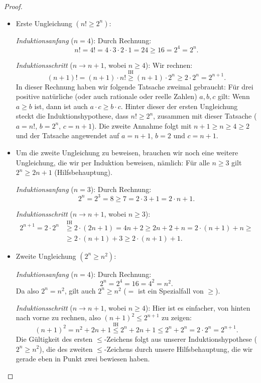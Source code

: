 \documentclass[a4paper,ngerman,12pt]{scrartcl}
\theoremstyle{definition}
\begin{document}
\begin{proof}
  \begin{itemize}
    \item Erste Ungleichung $(n! \geq 2^n)$:

    \emph{Induktionsanfang} ($n=4$): Durch Rechnung:
    \[ n! = 4! = 4 \cdot 3 \cdot 2 \cdot 1 = 24 \geq 16 = 2^4 = 2^n. \]

    \emph{Induktionsschritt} ($n \to n{+}1$, wobei $n \geq 4$): Wir rechnen:
    \[ (n+1)! = (n+1) \cdot n! \overset{\text{IH}}{\geq} (n+1) \cdot 2^n \geq 2 \cdot 2^n = 2^{n+1}. \]
    In dieser Rechnung haben wir folgende Tatsache zweimal gebraucht: Für drei positive natürliche (oder auch rationale oder reelle Zahlen) $a, b, c$ gilt: Wenn $a \geq b$ ist, dann ist auch $a \cdot c \geq b \cdot c$. Hinter dieser der ersten Ungleichung steckt die Induktionshypothese, dass $n! \geq 2^n$, zusammen mit dieser Tatsache ($a = n!$, $b = 2^n$, $c = n+1$). Die zweite Annahme folgt mit $n+1 \geq n \geq 4 \geq 2$ und der Tatsache angewendet auf $a = n{+}1$, $b = 2$ und $c = n{+}1$.

    \item Um die zweite Ungleichung zu beweisen, brauchen wir noch eine weitere Ungleichung, die wir per Induktion beweisen, nämlich: Für alle $n \geq 3$ gilt $2^n \geq 2n + 1$ (Hilfsbehauptung).

    \emph{Induktionsanfang} ($n=3$): Durch Rechnung:
    \[ 2^n = 2^3 = 8 \geq 7 = 2 \cdot 3 + 1 = 2 \cdot n + 1. \]

    \emph{Induktionsschritt} ($n \to n{+}1$, wobei $n \geq 3$):
    \begin{align*}
      2^{n+1} = 2 \cdot 2^n &\overset{\text{IH}}{\geq} 2 \cdot (2n + 1) = 4n + 2 \geq 2n + 2 + n = 2 \cdot (n+1) + n \geq\\
      &\geq 2 \cdot (n+1) + 3 \geq 2 \cdot (n+1) + 1.
    \end{align*}

    \item Zweite Ungleichung $(2^n \geq n^2)$:

    \emph{Induktionsanfang} ($n=4$): Durch Rechnung:
    \[ 2^n = 2^4 = 16 = 4^2 = n^2. \]
    Da also $2^n = n^2$, gilt auch $2^n \geq n^2$ ($=$ ist ein Spezialfall von $\geq$).

    \emph{Induktionsschritt} ($n \to n{+}1$, wobei $n \geq 4$): Hier ist es einfacher, von hinten nach vorne zu rechnen, also $(n+1)^2 \leq 2^{n+1}$ zu zeigen:
    \[ (n+1)^2 = n^2 + 2n + 1 \overset{\text{IH}}{\leq} 2^n + 2n + 1 \leq 2^n + 2^n = 2 \cdot 2^n = 2^{n+1}. \]
    Die Gültigkeit des ersten $\leq$-Zeichens folgt aus unserer Induktionshypothese ($2^n \geq n^2$), die des zweiten $\leq$-Zeichens durch unsere Hilfsbehauptung, die wir gerade eben in Punkt zwei bewiesen haben.\qedhere
  \end{itemize}
\end{proof}
\end{document}
